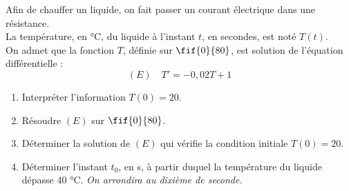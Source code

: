 \documentclass[a4paper,11pt,exos]{nsi}
\begin{document}
\maketitle

\exo{}
Afin de chauffer un liquide, on fait passer un courant électrique dans une résistance.\\
La température, en °C, du liquide à l'instant $t$, en secondes, est noté $T(t)$.\\
On admet que la fonction $T$, définie sur $\fif{0}{80}$, est solution de l'équation différentielle :
$$(E) \quad T'=-0{,}02T+1$$
\begin{enumerate}
    \item Interpréter l'information $T(0)=20$.
    \item Résoudre $(E)$ sur $\fif{0}{80}$.
    \item Déterminer la solution de $(E)$ qui vérifie la condition initiale $T(0)=20$.
    \item Déterminer l'instant $t_0$, en s, à partir duquel la température du liquide dépasse 40 °C. \textit{On arrondira au dixième de seconde.}
\end{enumerate}
\end{document}
